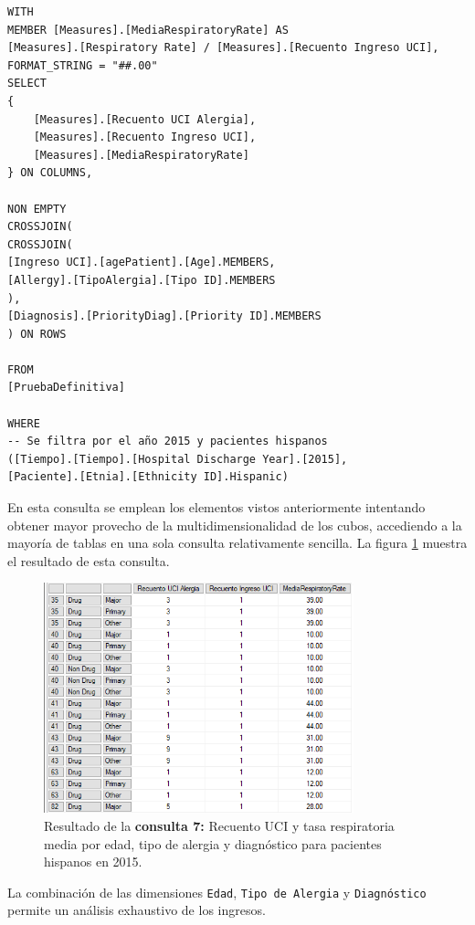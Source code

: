 \documentclass[12pt, a4paper, twoside]{article}
\begin{document}
	\begin{verbatim}
WITH 
MEMBER [Measures].[MediaRespiratoryRate] AS
[Measures].[Respiratory Rate] / [Measures].[Recuento Ingreso UCI],
FORMAT_STRING = "##.00"
SELECT 
{ 
	[Measures].[Recuento UCI Alergia],
	[Measures].[Recuento Ingreso UCI],
	[Measures].[MediaRespiratoryRate]
} ON COLUMNS,

NON EMPTY 
CROSSJOIN(
CROSSJOIN(
[Ingreso UCI].[agePatient].[Age].MEMBERS, 
[Allergy].[TipoAlergia].[Tipo ID].MEMBERS
),
[Diagnosis].[PriorityDiag].[Priority ID].MEMBERS 
) ON ROWS

FROM 
[PruebaDefinitiva]

WHERE 
-- Se filtra por el año 2015 y pacientes hispanos 
([Tiempo].[Tiempo].[Hospital Discharge Year].[2015], 
[Paciente].[Etnia].[Ethnicity ID].Hispanic)

	\end{verbatim}
	
	En esta consulta se emplean los elementos vistos anteriormente intentando obtener mayor provecho de la multidimensionalidad de los cubos, accediendo a la mayoría de tablas en una sola consulta relativamente sencilla. La figura \ref{fig:consulta7} muestra el resultado de esta consulta.
	
	\begin{figure}[H]
		\centering
		\includegraphics[width=0.8\textwidth]{image/consulta7.png}
		\caption{Resultado de la \textbf{consulta 7:} Recuento UCI y tasa respiratoria media por edad, tipo de alergia y diagnóstico para pacientes hispanos en 2015.}
		\label{fig:consulta7}
	\end{figure}
	
	La combinación de las dimensiones \texttt{Edad}, \texttt{Tipo de Alergia} y \texttt{Diagnóstico} permite un análisis exhaustivo de los ingresos.
	
\end{document}
